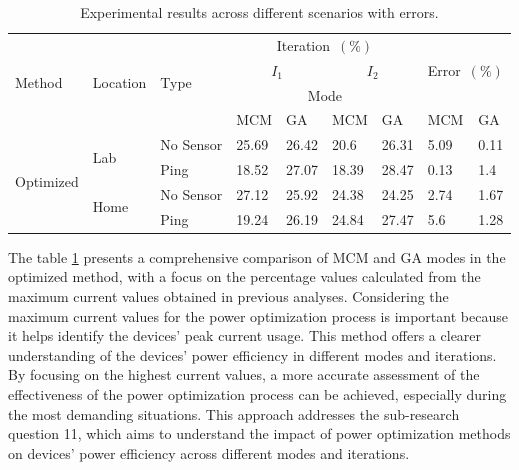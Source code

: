 \begin{longtable}{lllllllll}
  \label{tab:experimental_results}\\
  \caption{Experimental results across different scenarios with errors.}\\
  \hline\hline
  \multirow{4}{*}{Method}    & \multirow{4}{*}{Location} & \multirow{4}{*}{Type} & \multicolumn{4}{c}{Iteration~$(\%)$}                  & \multicolumn{2}{l}{\multirow{3}{*}{Error~$(\%)$}} \\*
  \cline{4-7}
                             &                           &                       & \multicolumn{2}{c}{$I_1$} & \multicolumn{2}{c}{$I_2$} & \multicolumn{2}{l}{}                              \\*
  \cline{4-7}
                             &                           &                       & \multicolumn{4}{c}{Mode}                              & \multicolumn{2}{l}{}                              \\*
  \cline{4-9}
                             &                           &                       & MCM   & GA                & MCM   & GA                & MCM  & GA                                         \\*
  \hline
  \multirow{4}{*}{Optimized} & \multirow{2}{*}{Lab}      & No Sensor             & 25.69 & 26.42             & 20.6  & 26.31             & 5.09 & 0.11                                       \\*
                             &                           & Ping                  & 18.52 & 27.07             & 18.39 & 28.47             & 0.13 & 1.4                                        \\*
  \cline{2-9}
                             & \multirow{2}{*}{Home}     & No Sensor             & 27.12 & 25.92             & 24.38 & 24.25             & 2.74 & 1.67                                       \\*
                             &                           & Ping                  & 19.24 & 26.19             & 24.84 & 27.47             & 5.6  & 1.28                                       \\
  \hline\hline
\end{longtable}

The table \ref{tab:experimental_results} presents a comprehensive comparison of \gls{MCM} and \gls{GA} modes in the optimized method, with a focus on the percentage values calculated from the maximum current values obtained in previous analyses. Considering the maximum current values for the power optimization process is important because it helps identify the devices' peak current usage. This method offers a clearer understanding of the devices' power efficiency in different modes and iterations. By focusing on the highest current values, a more accurate assessment of the effectiveness of the power optimization process can be achieved, especially during the most demanding situations. This approach addresses the sub-research question 11, which aims to understand the impact of power optimization methods on devices' power efficiency across different modes and iterations.

